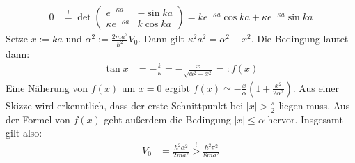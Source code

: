\documentclass[a4paper,12pt]{article}
\newcommand{\kla}{}
\begin{document}
\begin{enumerate}
\begin{align*}
0&\overset{!}{=}\det\begin{pmatrix}
e^{-\kappa a} & -\sin ka \\ \kappa e^{-\kappa a} & k\cos ka
\end{pmatrix}=ke^{-\kappa a}\cos ka +\kappa e^{-\kappa a} \sin ka
\end{align*}
Setze $x:=ka$ und $\alpha^2:=\frac{2ma^2}{\hbar^2}V_0$. Dann gilt $\kappa^2a^2=\alpha^2-x^2$. Die Bedingung lautet dann:
\begin{align*}
\tan x&=-\frac{k}{\kappa}=-\frac{x}{\sqrt{\alpha^2-x^2}}=:f(x)
\end{align*}
Eine Näherung von $f(x)$ um $x=0$ ergibt $f(x)\simeq -\frac{x}{\alpha}\kla\left( {1+\frac{x^2}{2\alpha^2}} \right)$. Aus einer Skizze wird erkenntlich, dass der erste Schnittpunkt bei $|x|>\frac{\pi}{2}$ liegen muss. Aus der Formel von $f(x)$ geht außerdem die Bedingung $|x|\le\alpha$ hervor. Insgesamt gilt also:
\begin{align*}
V_0&=\frac{\hbar^2\alpha^2}{2ma^2}\overset{!}{>}\frac{\hbar^2\pi^2}{8ma^2}
\end{align*}
\end{enumerate}
\end{document}
